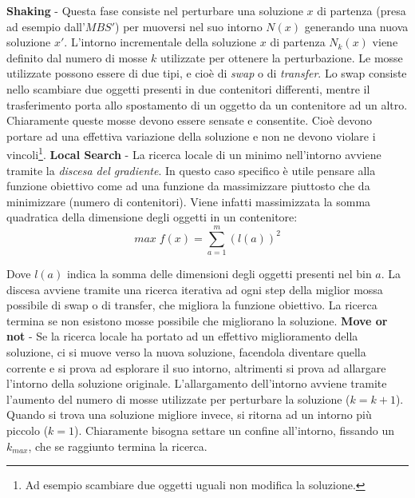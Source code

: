 \documentclass{article}
\begin{document}
\textbf{Shaking} - Questa fase consiste nel perturbare una soluzione $x$ di partenza (presa ad esempio dall'$MBS'$) per muoversi nel suo intorno $N(x)$ generando una nuova soluzione $x'$. L'intorno incrementale della soluzione $x$ di partenza $N_{k}(x)$ viene definito dal numero di mosse $k$ utilizzate per ottenere la perturbazione. 
\newline
\newline
Le mosse utilizzate possono essere di due tipi, e cioè di \textit{swap} o di \textit{transfer}. Lo swap consiste nello scambiare due oggetti presenti in due contenitori differenti, mentre il trasferimento porta allo spostamento di un oggetto da un contenitore ad un altro. Chiaramente queste mosse devono essere sensate e consentite. Cioè devono portare ad una effettiva variazione della soluzione e non ne devono violare i vincoli\footnote{Ad esempio scambiare due oggetti uguali non modifica la soluzione.}. 
\newline
\newline
\textbf{Local Search} - La ricerca locale di un minimo nell'intorno avviene tramite la \textit{discesa del gradiente}. In questo caso specifico è utile pensare alla funzione obiettivo come ad una funzione da massimizzare piuttosto che da minimizzare (numero di contenitori). Viene infatti massimizzata la somma quadratica della dimensione degli oggetti in un contenitore:
\[
max\;f(x) = \sum_{a=1}^{m} (l(a))^2
\]

Dove $l(a)$ indica la somma delle dimensioni degli oggetti presenti nel bin $a$.
La discesa avviene tramite una ricerca iterativa ad ogni step della miglior mossa possibile di swap o di transfer, che migliora la funzione obiettivo. La ricerca termina se non esistono mosse possibile che migliorano la soluzione.
\newline
\newline
\textbf{Move or not} - Se la ricerca locale ha portato ad un effettivo miglioramento della soluzione, ci si muove verso la nuova soluzione, facendola diventare quella corrente e si prova ad esplorare il suo intorno, altrimenti si prova ad allargare l'intorno della soluzione originale. L'allargamento dell'intorno avviene tramite l'aumento del numero di mosse utilizzate per perturbare la soluzione ($k=k+1$). Quando si trova una soluzione migliore invece, si ritorna ad un intorno più piccolo ($k=1$). Chiaramente bisogna settare un confine all'intorno, fissando un $k_{max}$, che se raggiunto termina la ricerca.


\end{document}
